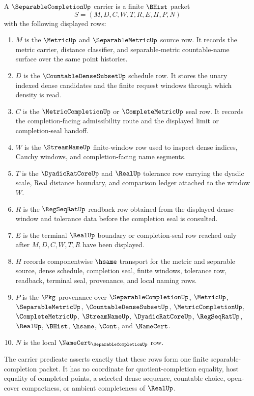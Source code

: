 \begin{definition}\label{def:separable-completion-carrier}
A $\SeparableCompletionUp$ carrier is a finite $\BHist$ packet
$$
S=(M,D,C,W,T,R,E,H,P,N)
$$
with the following displayed rows:
\begin{enumerate}
\item $M$ is the $\MetricUp$ and $\SeparableMetricUp$ source row. It records the metric carrier, distance classifier, and separable-metric countable-name surface over the same point histories.
\item $D$ is the $\CountableDenseSubsetUp$ schedule row. It stores the unary indexed dense candidates and the finite request windows through which density is read.
\item $C$ is the $\MetricCompletionUp$ or $\CompleteMetricUp$ seal row. It records the completion-facing admissibility route and the displayed limit or completion-seal handoff.
\item $W$ is the $\StreamNameUp$ finite-window row used to inspect dense indices, Cauchy windows, and completion-facing name segments.
\item $T$ is the $\DyadicRatCoreUp$ and $\RealUp$ tolerance row carrying the dyadic scale, Real distance boundary, and comparison ledger attached to the window $W$.
\item $R$ is the $\RegSeqRatUp$ readback row obtained from the displayed dense-window and tolerance data before the completion seal is consulted.
\item $E$ is the terminal $\RealUp$ boundary or completion-seal row reached only after $M,D,C,W,T,R$ have been displayed.
\item $H$ records componentwise $\hsame$ transport for the metric and separable source, dense schedule, completion seal, finite windows, tolerance row, readback, terminal seal, provenance, and local naming rows.
\item $P$ is the $\Pkg$ provenance over $\SeparableCompletionUp$, $\MetricUp$, $\SeparableMetricUp$, $\CountableDenseSubsetUp$, $\MetricCompletionUp$, $\CompleteMetricUp$, $\StreamNameUp$, $\DyadicRatCoreUp$, $\RegSeqRatUp$, $\RealUp$, $\BHist$, $\hsame$, $\Cont$, and $\NameCert$.
\item $N$ is the local $\NameCert_{\SeparableCompletionUp}$ row.
\end{enumerate}
The carrier predicate asserts exactly that these rows form one finite separable-completion packet. It has no coordinate for quotient-completion equality, host equality of completed points, a selected dense sequence, countable choice, open-cover compactness, or ambient completeness of $\RealUp$.
\end{definition}

